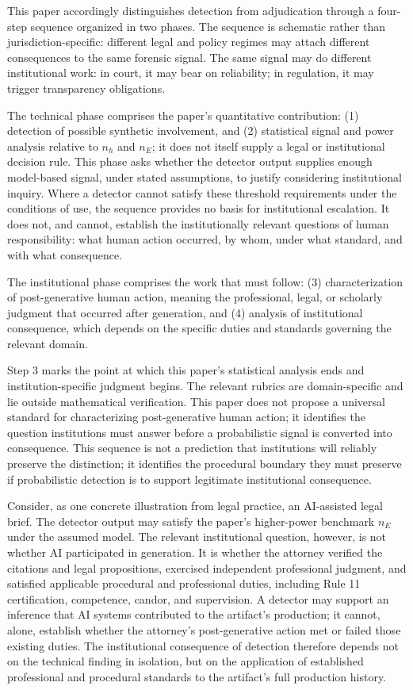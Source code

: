 \documentclass[11pt]{article}
\begin{document}
This paper accordingly distinguishes detection from adjudication through a four-step
sequence organized in two phases. The sequence is schematic rather than
jurisdiction-specific: different legal and policy regimes may attach different
consequences to the same forensic signal. The same signal may do different
institutional work: in court, it may bear on reliability; in regulation, it may
trigger transparency obligations.

The technical phase comprises the paper's quantitative contribution: (1) detection of
possible synthetic involvement, and (2) statistical signal and power analysis
relative to $n_h$ and $n_E$; it does not itself supply a legal or institutional
decision rule. This phase asks whether the detector output supplies enough
model-based signal, under stated assumptions, to justify considering institutional
inquiry. Where a detector cannot satisfy these threshold requirements under the
conditions of use, the sequence provides no basis for institutional escalation. It
does not, and cannot, establish the institutionally relevant questions of human
responsibility: what human action occurred, by whom, under what standard, and with
what consequence.

The institutional phase comprises the work that must follow: (3) characterization of
post-generative human action, meaning the professional, legal, or scholarly judgment
that occurred after generation, and (4) analysis of institutional consequence, which
depends on the specific duties and standards governing the relevant domain.

Step 3 marks the point at which this paper's statistical analysis ends and
institution-specific judgment begins. The relevant rubrics are domain-specific and
lie outside mathematical verification. This paper does not propose a universal
standard for characterizing post-generative human action; it identifies the question
institutions must answer before a probabilistic signal is converted into consequence.
This sequence is not a prediction that institutions will reliably preserve the
distinction; it identifies the procedural boundary they must preserve if
probabilistic detection is to support legitimate institutional consequence.

Consider, as one concrete illustration from legal practice, an AI-assisted legal
brief. The detector output may satisfy the paper's higher-power benchmark $n_E$ under
the assumed model. The relevant institutional question, however, is not whether AI
participated in generation. It is whether the attorney verified the citations and
legal propositions, exercised independent professional judgment, and satisfied
applicable procedural and professional duties, including Rule 11 certification,
competence, candor, and supervision. A detector may support an inference that AI
systems contributed to the artifact's production; it cannot, alone, establish whether
the attorney's post-generative action met or failed those existing duties. The
institutional consequence of detection therefore depends not on the technical finding
in isolation, but on the application of established professional and procedural
standards to the artifact's full production history.
\end{document}
